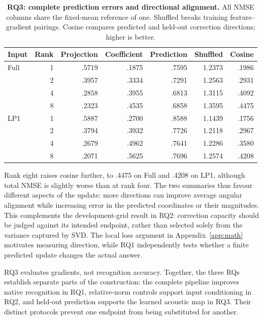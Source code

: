 \documentclass{article}
\begin{document}
\begin{table}[t]
\caption{\textbf{RQ3: complete prediction errors and directional alignment.} All NMSE columns share the fixed-mean reference of one. Shuffled breaks training feature--gradient pairings. Cosine compares predicted and held-out correction directions; higher is better.}
\label{tab:f1_all}
\centering\small
\begin{tabular}{@{}lrrrrrr@{}}
\toprule
Input & Rank & Projection & Coefficient & Prediction & Shuffled & Cosine \\
\midrule
Full & 1 & .5719 & .1875 & .7595 & 1.2373 & .1986 \\
 & 2 & .3957 & .3334 & .7291 & 1.2563 & .2931 \\
 & 4 & .2858 & .3955 & .6813 & 1.3115 & .4092 \\
 & 8 & .2323 & .4535 & .6858 & 1.3595 & .4475 \\
\midrule
LP1 & 1 & .5887 & .2700 & .8588 & 1.1439 & .1756 \\
 & 2 & .3794 & .3932 & .7726 & 1.2118 & .2967 \\
 & 4 & .2679 & .4962 & .7641 & 1.2286 & .3580 \\
 & 8 & .2071 & .5625 & .7696 & 1.2574 & .4208 \\
\bottomrule
\end{tabular}
\end{table}

Rank eight raises cosine further, to .4475 on Full and .4208 on LP1, although total NMSE is slightly worse than at rank four. The two summaries thus favour different aspects of the update: more directions can improve average angular alignment while increasing error in the predicted coordinates or their magnitudes. This complements the development-grid result in RQ2: correction capacity should be judged against its intended endpoint, rather than selected solely from the variance captured by SVD. The local loss argument in Appendix~\ref{app:math} motivates measuring direction, while RQ1 independently tests whether a finite predicted update changes the actual answer.

RQ3 evaluates gradients, not recognition accuracy. Together, the three RQs establish separate parts of the construction: the complete pipeline improves native recognition in RQ1, relative-norm controls support input conditioning in RQ2, and held-out prediction supports the learned acoustic map in RQ3. Their distinct protocols prevent one endpoint from being substituted for another.
\end{document}
